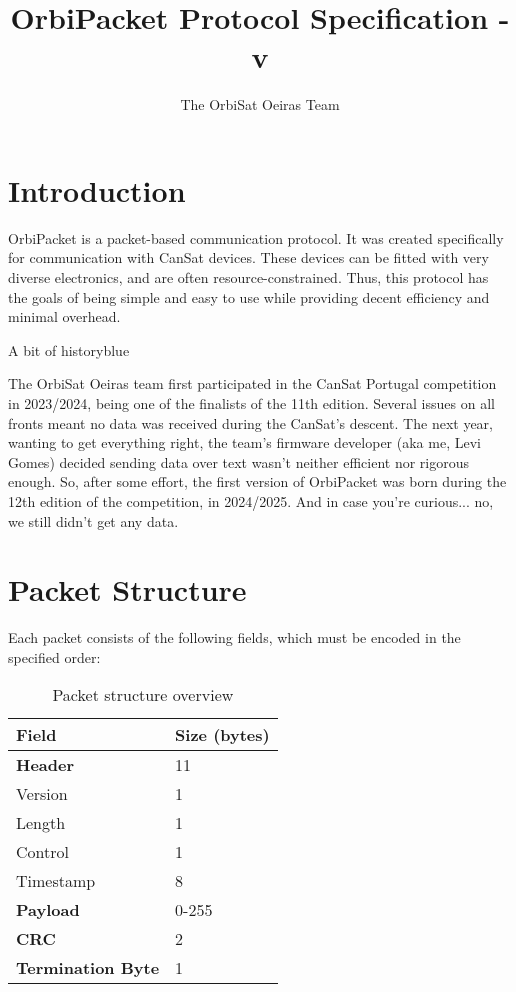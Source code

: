 \documentclass[a4paper,11pt,english]{article}
\title{OrbiPacket Protocol Specification - v\version}
\author{The OrbiSat Oeiras Team}
\date{}
\def\notebox#1#2{
  \begin{admobox}{#1}{blue}
  #2
  \end{admobox}
}
\begin{document}
\maketitle

\tableofcontents

\section{Introduction}

OrbiPacket is a packet-based communication protocol. It was created specifically for communication with CanSat devices. These devices can be fitted with very diverse electronics, and are often resource-constrained. Thus, this protocol has the goals of being simple and easy to use while providing decent efficiency and minimal overhead.

\notebox{A bit of history}{
  The OrbiSat Oeiras team first participated in the CanSat Portugal competition in 2023/2024, being one of the finalists of the 11th edition. Several issues on all fronts meant no data was received during the CanSat's descent. The next year, wanting to get everything right, the team's firmware developer (aka me, Levi Gomes) decided sending data over text wasn't neither efficient nor rigorous enough. So, after some effort, the first version of OrbiPacket was born during the 12th edition of the competition, in 2024/2025. And in case you're curious... no, we still didn't get any data.
}

\section{Packet Structure}

Each packet consists of the following fields, which must be encoded in the specified order:

\begin{table}[h]
  \centering
  \begin{tabular}{ll}
    \toprule
    Field                     & Size (bytes) \\
    \midrule
    \textbf{Header}           & 11           \\
    Version                   & 1            \\
    Length                    & 1            \\
    Control                   & 1            \\
    Timestamp                 & 8            \\
    \textbf{Payload}          & 0-255        \\
    \textbf{CRC}              & 2            \\
    \textbf{Termination Byte} & 1            \\
    \bottomrule
  \end{tabular}
  \caption{Packet structure overview}
  \label{table:struct}
\end{table}
\end{document}
